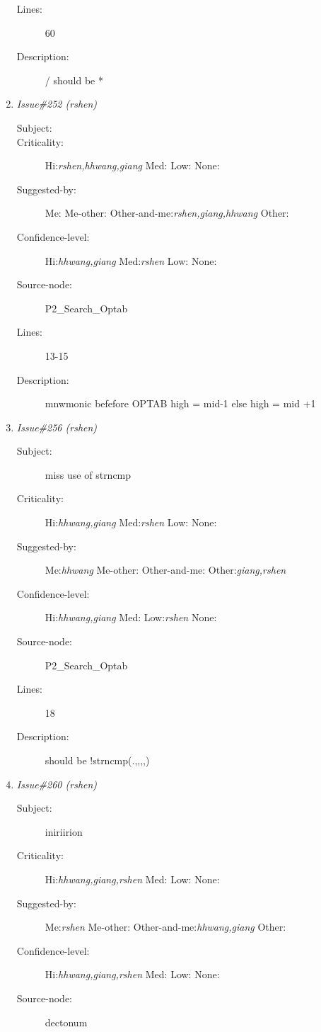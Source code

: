 \begin{enumerate}
\begin{description}
\item [Lines:] 60

\item [Description:] / should be *
\end{description}
\item {\it Issue\#252 (rshen)}
\begin{description}
\item [Subject:] 
\item [Criticality:] Hi:{\it rshen,hhwang,giang} Med:{\it } Low:{\it } None:{\it }
\item [Suggested-by:] Me:{\it } Me-other:{\it } Other-and-me:{\it rshen,giang,hhwang} Other:{\it }
\item [Confidence-level:] Hi:{\it hhwang,giang} Med:{\it rshen} Low:{\it } None:{\it }
\item [Source-node:] P2\_Search\_Optab

\item [Lines:] 13-15

\item [Description:] mnwmonic befefore OPTAB high = mid-1 else high = mid +1
\end{description}
\item {\it Issue\#256 (rshen)}
\begin{description}
\item [Subject:] miss use of strncmp
\item [Criticality:] Hi:{\it hhwang,giang} Med:{\it rshen} Low:{\it } None:{\it }
\item [Suggested-by:] Me:{\it hhwang} Me-other:{\it } Other-and-me:{\it } Other:{\it giang,rshen}
\item [Confidence-level:] Hi:{\it hhwang,giang} Med:{\it } Low:{\it rshen} None:{\it }
\item [Source-node:] P2\_Search\_Optab

\item [Lines:] 18

\item [Description:] should be !strncmp(.,,,,)
\end{description}
\item {\it Issue\#260 (rshen)}
\begin{description}
\item [Subject:] iniriirion
\item [Criticality:] Hi:{\it hhwang,giang,rshen} Med:{\it } Low:{\it } None:{\it }
\item [Suggested-by:] Me:{\it rshen} Me-other:{\it } Other-and-me:{\it hhwang,giang} Other:{\it }
\item [Confidence-level:] Hi:{\it hhwang,giang,rshen} Med:{\it } Low:{\it } None:{\it }
\item [Source-node:] dectonum


\end{description}
\end{enumerate}
